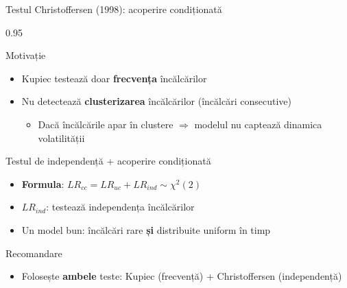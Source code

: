 \documentclass[9pt, aspectratio=169, t]{beamer}
\begin{document}
\begin{frame}{Testul Christoffersen (1998): acoperire condiționată}
    \small
    \begin{cminipage}{0.95\textwidth}
        \begin{block}{Motivație}
            \begin{itemize}\setlength{\itemsep}{0pt}
                \item Kupiec testează doar \textbf{frecvența} încălcărilor
                \item Nu detectează \textbf{clusterizarea} încălcărilor (încălcări consecutive)
                    \begin{itemize}\setlength{\itemsep}{0pt}
                        \item Dacă încălcările apar în clustere $\Rightarrow$ modelul nu captează dinamica volatilității
                    \end{itemize}
            \end{itemize}
        \end{block}
        \vspace{-0.1cm}
        \begin{block}{Testul de independență + acoperire condiționată}
            \begin{itemize}\setlength{\itemsep}{0pt}
                \item \textbf{Formula}: $LR_{cc} = LR_{uc} + LR_{ind} \sim \chi^2(2)$
                \item $LR_{ind}$: testează independența încălcărilor
                \item Un model bun: încălcări rare \textbf{și} distribuite uniform în timp
            \end{itemize}
        \end{block}
        \vspace{-0.1cm}
        \begin{alertblock}{Recomandare}
            \begin{itemize}\setlength{\itemsep}{0pt}
                \item Folosește \textbf{ambele} teste: Kupiec (frecvență) + Christoffersen (independență)
            \end{itemize}
        \end{alertblock}
    \end{cminipage}
\end{frame}
\end{document}
